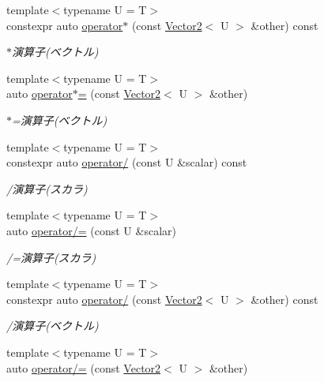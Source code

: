 \begin{DoxyCompactItemize}
{\footnotesize template$<$typename U  = T$>$ }\\constexpr auto \mbox{\hyperlink{classsaki_1_1_vector2_a8d7e95b686af377470dd5514f2bb00f3}{operator$\ast$}} (const \mbox{\hyperlink{classsaki_1_1_vector2}{Vector2}}$<$ U $>$ \&other) const
\begin{DoxyCompactList}\small\item\em $\ast$演算子(ベクトル) \end{DoxyCompactList}\item 
{\footnotesize template$<$typename U  = T$>$ }\\auto \mbox{\hyperlink{classsaki_1_1_vector2_a31e1e9e5918b362e2559b453da787fbb}{operator$\ast$=}} (const \mbox{\hyperlink{classsaki_1_1_vector2}{Vector2}}$<$ U $>$ \&other)
\begin{DoxyCompactList}\small\item\em $\ast$=演算子(ベクトル) \end{DoxyCompactList}\item 
{\footnotesize template$<$typename U  = T$>$ }\\constexpr auto \mbox{\hyperlink{classsaki_1_1_vector2_a6d518ed5e6fa2cf13570c6bb566d0b75}{operator/}} (const U \&scalar) const
\begin{DoxyCompactList}\small\item\em /演算子(スカラ) \end{DoxyCompactList}\item 
{\footnotesize template$<$typename U  = T$>$ }\\auto \mbox{\hyperlink{classsaki_1_1_vector2_a77f6c9bcfeb9f830edf2883069894a30}{operator/=}} (const U \&scalar)
\begin{DoxyCompactList}\small\item\em /=演算子(スカラ) \end{DoxyCompactList}\item 
{\footnotesize template$<$typename U  = T$>$ }\\constexpr auto \mbox{\hyperlink{classsaki_1_1_vector2_afa7038cba7fcdefee0f23dcd18cf8a59}{operator/}} (const \mbox{\hyperlink{classsaki_1_1_vector2}{Vector2}}$<$ U $>$ \&other) const
\begin{DoxyCompactList}\small\item\em /演算子(ベクトル) \end{DoxyCompactList}\item 
{\footnotesize template$<$typename U  = T$>$ }\\auto \mbox{\hyperlink{classsaki_1_1_vector2_a8d4c4c7a19f84fc4eac995bdf9f93a13}{operator/=}} (const \mbox{\hyperlink{classsaki_1_1_vector2}{Vector2}}$<$ U $>$ \&other)

\end{DoxyCompactItemize}

